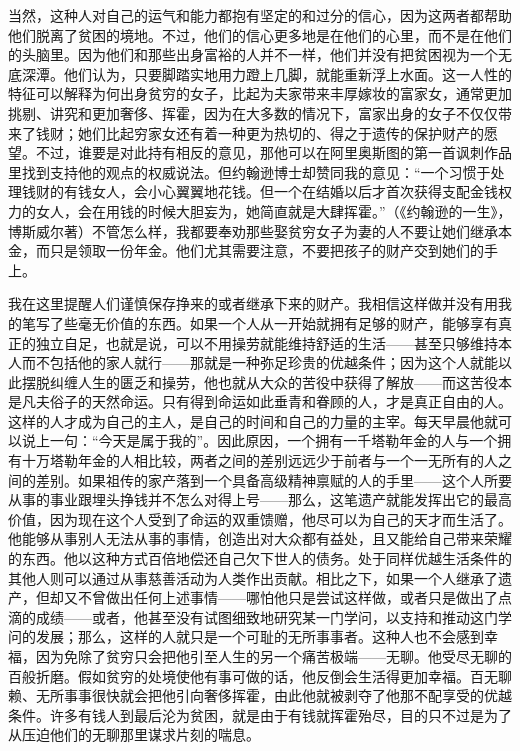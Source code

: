 \documentclass[12pt,oneside]{book}
\begin{document}
当然，这种人对自己的运气和能力都抱有坚定的和过分的信心，因为这两者都帮助他们脱离了贫困的境地。不过，他们的信心更多地是在他们的心里，而不是在他们的头脑里。因为他们和那些出身富裕的人并不一样，他们并没有把贫困视为一个无底深潭。他们认为，只要脚踏实地用力蹬上几脚，就能重新浮上水面。这一人性的特征可以解释为何出身贫穷的女子，比起为夫家带来丰厚嫁妆的富家女，通常更加挑剔、讲究和更加奢侈、挥霍，因为在大多数的情况下，富家出身的女子不仅仅带来了钱财；她们比起穷家女还有着一种更为热切的、得之于遗传的保护财产的愿望。不过，谁要是对此持有相反的意见，那他可以在阿里奥斯图的第一首讽刺作品里找到支持他的观点的权威说法。但约翰逊博士却赞同我的意见：“一个习惯于处理钱财的有钱女人，会小心翼翼地花钱。但一个在结婚以后才首次获得支配金钱权力的女人，会在用钱的时候大胆妄为，她简直就是大肆挥霍。”（《约翰逊的一生》，博斯威尔著）不管怎么样，我都要奉劝那些娶贫穷女子为妻的人不要让她们继承本金，而只是领取一份年金。他们尤其需要注意，不要把孩子的财产交到她们的手上。 

我在这里提醒人们谨慎保存挣来的或者继承下来的财产。我相信这样做并没有用我的笔写了些毫无价值的东西。如果一个人从一开始就拥有足够的财产，能够享有真正的独立自足，也就是说，可以不用操劳就能维持舒适的生活——甚至只够维持本人而不包括他的家人就行——那就是一种弥足珍贵的优越条件；因为这个人就能以此摆脱纠缠人生的匮乏和操劳，他也就从大众的苦役中获得了解放——而这苦役本是凡夫俗子的天然命运。只有得到命运如此垂青和眷顾的人，才是真正自由的人。这样的人才成为自己的主人，是自己的时间和自己的力量的主宰。每天早晨他就可以说上一句：“今天是属于我的”。因此原因，一个拥有一千塔勒年金的人与一个拥有十万塔勒年金的人相比较，两者之间的差别远远少于前者与一个一无所有的人之间的差别。如果祖传的家产落到一个具备高级精神禀赋的人的手里——这个人所要从事的事业跟埋头挣钱并不怎么对得上号——那么，这笔遗产就能发挥出它的最高价值，因为现在这个人受到了命运的双重馈赠，他尽可以为自己的天才而生活了。他能够从事别人无法从事的事情，创造出对大众都有益处，且又能给自己带来荣耀的东西。他以这种方式百倍地偿还自己欠下世人的债务。处于同样优越生活条件的其他人则可以通过从事慈善活动为人类作出贡献。相比之下，如果一个人继承了遗产，但却又不曾做出任何上述事情——哪怕他只是尝试这样做，或者只是做出了点滴的成绩——或者，他甚至没有试图细致地研究某一门学问，以支持和推动这门学问的发展；那么，这样的人就只是一个可耻的无所事事者。这种人也不会感到幸福，因为免除了贫穷只会把他引至人生的另一个痛苦极端——无聊。他受尽无聊的百般折磨。假如贫穷的处境使他有事可做的话，他反倒会生活得更加幸福。百无聊赖、无所事事很快就会把他引向奢侈挥霍，由此他就被剥夺了他那不配享受的优越条件。许多有钱人到最后沦为贫困，就是由于有钱就挥霍殆尽，目的只不过是为了从压迫他们的无聊那里谋求片刻的喘息。 
\end{document}
